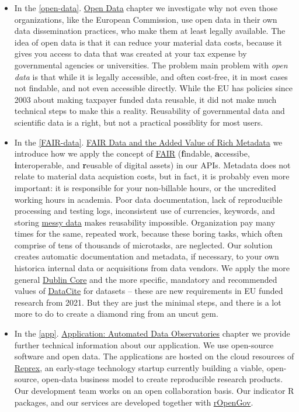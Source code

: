 \documentclass[
  a4paper,
  openany, a4paper, oneside]{book}
\begin{document}
\begin{itemize}
\item
  In the \ref{open-data}. \protect\hyperlink{open-data}{Open Data} chapter we investigate why not even those organizations, like the European Commission, use open data in their own data dissemination practices, who make them at least legally available. The idea of open data is that it can reduce your material data costs, because it gives you access to data that was created at your tax expense by governmental agencies or universities. The problem main problem with \emph{open data} is that while it is legally accessible, and often cost-free, it in most cases not findable, and not even accessible directly. While the EU has policies since 2003 about making taxpayer funded data reusable, it did not make much technical steps to make this a reality. Reusability of governmental data and scientific data is a right, but not a practical possiblity for most users.
\item
  In the \ref{FAIR-data}. \protect\hyperlink{FAIR-data}{FAIR Data and the Added Value of Rich Metadata} we introduce how we apply the concept of \protect\hyperlink{FAIR}{FAIR} (\textbf{f}indable, \textbf{a}ccessibe, \textbf{i}nteroperable, and \textbf{r}eusable of digital assets) in our APIs. Metadata does not relate to material data acquistion costs, but in fact, it is probably even more important: it is responsible for your non-billable hours, or the uncredited working hours in academia. Poor data documentation, lack of reproducible processing and testing logs, inconsistent use of currencies, keywords, and storing \protect\hyperlink{messy-data}{messy data} makes reusability impossible. Organization pay many times for the same, repeated work, because these boring tasks, which often comprise of tens of thousands of microtasks, are neglected. Our solution creates automatic documentation and metadata, if necessary, to your own historica internal data or acquisitions from data vendors. We apply the more general \protect\hyperlink{Dublin-Core}{Dublin Core} and the more specific, mandatory and recommended values of \protect\hyperlink{DataCite}{DataCite} for datasets -- these are new requirements in EU funded research from 2021. But they are just the minimal steps, and there is a lot more to do to create a diamond ring from an uncut gem.
\item
  In the \ref{app}. \protect\hyperlink{app}{Application: Automated Data Observatories} chapter we provide further technical information about our application. We use open-source software and open data. The applications are hosted on the cloud resources of \protect\hyperlink{reprex}{Reprex}, an early-stage technology startup currently building a viable, open-source, open-data business model to create reproducible research products. Our development team works on an open collaboration basis. Our indicator R packages, and our services are developed together with \href{https://music.dataobservatory.eu/author/ropengov/}{rOpenGov}.

\end{itemize}
\end{document}
